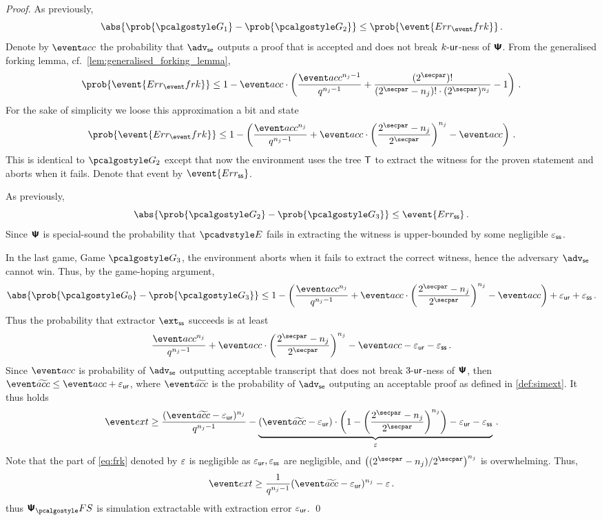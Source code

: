 \let\accentvec\vec \documentclass[runningheads,10pt]{llncs}
\begin{document}
\begin{proof}
	As previously, 
	\[
		\abs{\prob{\game{1}} - \prob{\game{2}}} \leq \prob{\event{\errfrk}}\,.
	\]
	Denote by $\accProb$ the probability that $\advse$ outputs a proof that is
  accepted and does not break ${k\text{-}\mathsf{ur}}$-ness of $\bm{\mathsf{\Psi}}$.
	From the generalised forking lemma, cf.~\cref{lem:generalised_forking_lemma}, 
	\[
		\prob{\event{\errfrk}} \leq 1 -
		\accProb \cdot \left(\frac{\accProb^{n_j - 1}}{q^{n_j - 1}} +
		\frac{(2^\secpar) !}{(2^\secpar - n_j)! \cdot
	(2^\secpar)^{n_j}} - 1\right)\,.
\]
For the sake of simplicity we loose this approximation a bit and state
\[
		\prob{\event{\errfrk}} \leq 1 -
		\left(\frac{\accProb^{n_j}}{q^{n_j - 1}} +
			\accProb \cdot \left(\frac{2^\secpar - n_j}{2^\secpar}\right)^{n_j} -
		\accProb\right)\,.
\]
	This is identical to $\game{2}$ except that now the environment uses the tree $\mathsf{T}$ to extract the witness for the proven statement and aborts when it fails. Denote that event by $\event{\errss}$.
	
	As previously, 
	\[
		\abs{\prob{\game{2}} - \prob{\game{3}}} \leq \event{\errss}\,.
	\]
	Since $\bm{\mathsf{\Psi}}$ is special-sound the probability that $\env$ fails in extracting the witness is upper-bounded by some negligible $\varepsilon_{\mathsf{ss}}$.
	
	In the last game, Game $\game{3}$, the environment aborts when it fails to extract the correct witness, hence the adversary $\advse$ cannot win. 
	Thus, by the game-hoping argument, 
	\[
		\abs{\prob{\game{0}} - \prob{\game{3}}} \leq 1 -
		\left(\frac{\accProb^{n_j}}{q^{n_j - 1}} + \accProb \cdot
		\left(\frac{2^\secpar - n_j}{2^\secpar}\right)^{n_j} - \accProb\right) + \epsur + \epsss\,.
	\]
	Thus the probability that extractor $\extss$ succeeds is at least
	\[
		\frac{\accProb^{n_j}}{q^{n_j - 1}} + 
		\accProb \cdot
		\left( \frac{2^\secpar - n_j}{2^\secpar}\right)^{n_j} -
	\accProb - \epsur - \epsss\,.
	\]
	Since $\accProb$ is probability of $\advse$ outputting acceptable transcript that does not break ${3\text{-}\mathsf{ur}}$-ness of $\bm{\mathsf{\Psi}}$, then $\waccProb \leq \accProb + \epsur$, where $\waccProb$ is the probability of $\advse$ outputing an acceptable proof as defined in \cref{def:simext}. It thus holds
	\[
 		\label{eq:frk}
 		\extProb \geq \frac{(\waccProb - \epsur)^{n_j}}{q^{n_j - 1}} -
		\underbrace{(\waccProb - \epsur) \cdot \left( 1 -
			\left(\frac{2^\secpar - n_j}{2^\secpar}\right)^{n_j}\right)
- \epsur - \epsss}_{\eps}\,.
 	\]
 	Note that the part of \cref{eq:frk} denoted by $\varepsilon$ is negligible as
	$\varepsilon_{\mathsf{ur}}, \varepsilon_{\mathsf{ss}}$ are negligible, and $\left(\infrac{(2^\secpar
	- n_j)}{2^\secpar}\right)^{n_j}$ is overwhelming.
	Thus, 
 	\[
 		\extProb \geq \frac{1}{q^{n_j - 1}} (\waccProb - \epsur)^{n_j} -\eps\,.
 	\] 
 	thus
 	$\psfs$ is simulation extractable with extraction error $\varepsilon_{\mathsf{ur}}$.
 	\qed
\end{proof}
\end{document}
